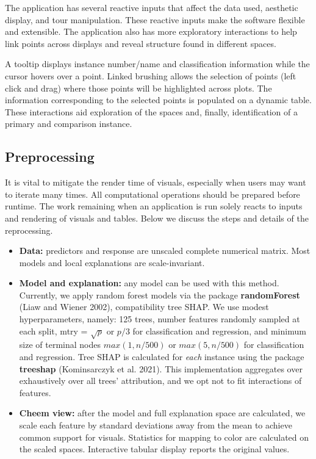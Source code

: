 \documentclass[
]{article}
\begin{document}
The application has several reactive inputs that affect the data used, aesthetic display, and tour manipulation. These reactive inputs make the software flexible and extensible. The application also has more exploratory interactions to help link points across displays and reveal structure found in different spaces.

A tooltip displays instance number/name and classification information while the cursor hovers over a point. Linked brushing allows the selection of points (left click and drag) where those points will be highlighted across plots. The information corresponding to the selected points is populated on a dynamic table. These interactions aid exploration of the spaces and, finally, identification of a primary and comparison instance.

\hypertarget{preprocessing}{%
\subsection{Preprocessing}\label{preprocessing}}

It is vital to mitigate the render time of visuals, especially when users may want to iterate many times. All computational operations should be prepared before runtime. The work remaining when an application is run solely reacts to inputs and rendering of visuals and tables. Below we discuss the steps and details of the reprocessing.




\begin{itemize}
    \item \textbf{Data:} predictors and response are unscaled complete numerical matrix. Most models and local explanations are scale-invariant.
    \item \textbf{Model and explanation:} any model can be used with this method. Currently, we apply random forest models via the package \textbf{randomForest} (Liaw and Wiener 2002), compatibility tree SHAP. We use modest hyperparameters, namely: 125 trees, number features randomly sampled at each split, mtry = $\sqrt{p}$ or $p/3$ for classification and regression, and minimum size of terminal nodes $max(1, n/500)$ or $max(5, n/500)$ for classification and regression. Tree SHAP is calculated for \emph{each} instance using the package \textbf{treeshap} (Kominsarczyk et al. 2021). This implementation aggregates over exhaustively over all trees' attribution, and we opt not to fit interactions of features. 
    \item \textbf{Cheem view:} after the model and full explanation space are calculated, we scale each feature by standard deviations away from the mean to achieve common support for visuals. Statistics for mapping to color are calculated on the scaled spaces. Interactive tabular display reports the original values.
\end{itemize}
\end{document}
